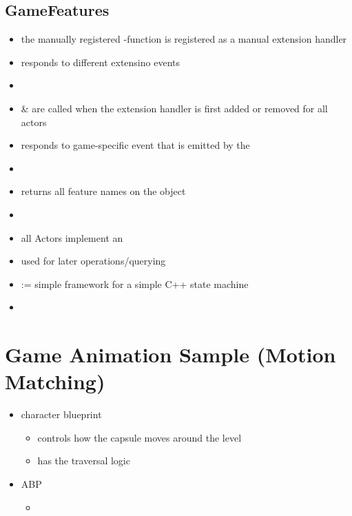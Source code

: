         \subsection{GameFeatures}
            \begin{itemize}
                \item the manually registered -function is registered as a manual extension handler
                \item responds to different extensino events
                \item {}
                \item {} \&  are called when the extension handler is first added or removed for all actors
                \item responds to game-specific  event that is emitted by the 
                \item 
                \item {} returns all feature names on the object
                \item 
                \item all Actors implement an 
                \item used for later operations/querying
                \item {} := simple framework for a simple C++ state machine
                \item 
            \end{itemize}

    \section{Game Animation Sample (Motion Matching)}

        \begin{itemize}
            \item character blueprint
            \begin{itemize}
                \item controls how the capsule moves around the level
                \item has the traversal logic
            \end{itemize}
            
            \item ABP
            \begin{itemize}
                \item 
            \end{itemize}
        \end{itemize}


